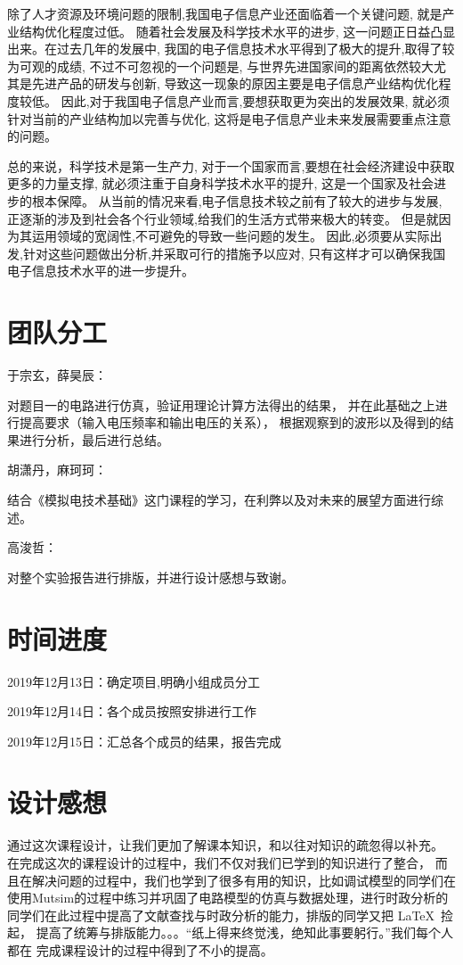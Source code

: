 \documentclass[10pt, conference, compsocconf, a4paper]{IEEEtran}
\begin{document}
除了人才资源及环境问题的限制,我国电子信息产业还面临着一个关键问题,
就是产业结构优化程度过低。 \cite{chen2014}
随着社会发展及科学技术水平的进步,
这一问题正日益凸显出来。在过去几年的发展中,
我国的电子信息技术水平得到了极大的提升,取得了较为可观的成绩,
不过不可忽视的一个问题是,
与世界先进国家间的距离依然较大尤其是先进产品的研发与创新,
导致这一现象的原因主要是电子信息产业结构优化程度较低。
因此,对于我国电子信息产业而言,要想获取更为突出的发展效果,
就必须针对当前的产业结构加以完善与优化,
这将是电子信息产业未来发展需要重点注意的问题。\cite{chen2014}
\par

总的来说，科学技术是第一生产力,
对于一个国家而言,要想在社会经济建设中获取更多的力量支撑,
就必须注重于自身科学技术水平的提升,
这是一个国家及社会进步的根本保障。
从当前的情况来看,电子信息技术较之前有了较大的进步与发展,
正逐渐的涉及到社会各个行业领域,给我们的生活方式带来极大的转变。
但是就因为其运用领域的宽阔性,不可避免的导致一些问题的发生。
因此,必须要从实际出发,针对这些问题做出分析,并采取可行的措施予以应对,
只有这样才可以确保我国电子信息技术水平的进一步提升。\par


\section{团队分工}

于宗玄，薛昊辰：\par
对题目一的电路进行仿真，验证用理论计算方法得出的结果，
并在此基础之上进行提高要求（输入电压频率和输出电压的关系）， 
根据观察到的波形以及得到的结果进行分析，最后进行总结。

胡潇丹，麻珂珂：\par
结合《模拟电技术基础》这门课程的学习，在利弊以及对未来的展望方面进行综述。

高浚哲：\par
对整个实验报告进行排版，并进行设计感想与致谢。


\section{时间进度}

2019年12月13日：确定项目,明确小组成员分工\par
2019年12月14日：各个成员按照安排进行工作\par
2019年12月15日：汇总各个成员的结果，报告完成\par

\section{设计感想}
通过这次课程设计，让我们更加了解课本知识，和以往对知识的疏忽得以补充。
在完成这次的课程设计的过程中，我们不仅对我们已学到的知识进行了整合，
而且在解决问题的过程中，我们也学到了很多有用的知识，比如调试模型的同学们在
使用Mutsim的过程中练习并巩固了电路模型的仿真与数据处理，进行时政分析的
同学们在此过程中提高了文献查找与时政分析的能力，排版的同学又把 \LaTeX\ 捡起，
提高了统筹与排版能力。。。“纸上得来终觉浅，绝知此事要躬行。”我们每个人都在
完成课程设计的过程中得到了不小的提高。
\end{document}
